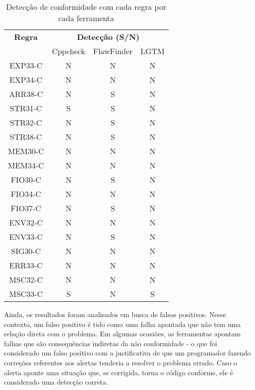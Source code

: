 \begin{table}[]
\begin{tabular}{@{}cccc@{}}
\toprule
\textbf{Regra} & \multicolumn{3}{c}{\textbf{Detecção (S/N)}} \\
               & Cppcheck & FlawFinder & LGTM \\ \midrule
EXP33-C        & N        & N          & N    \\ \midrule
EXP34-C        & N        & N          & N    \\ \midrule
ARR38-C        & N        & S          & N    \\ \midrule
STR31-C        & S        & S          & N    \\ \midrule
STR32-C        & N        & S          & N    \\ \midrule
STR38-C        & N        & S          & N    \\ \midrule
MEM30-C        & N        & N          & N    \\ \midrule
MEM34-C        & N        & N          & N    \\ \midrule
FIO30-C        & N        & S          & N    \\ \midrule
FIO34-C        & N        & N          & N    \\ \midrule
FIO37-C        & N        & S          & N    \\ \midrule
ENV32-C        & N        & N          & N    \\ \midrule
ENV33-C        & N        & S          & N    \\ \midrule
SIG30-C        & N        & N          & N    \\ \midrule
ERR33-C        & N        & N          & N    \\ \midrule
MSC32-C        & N        & N          & N    \\ \midrule
MSC33-C        & S        & N          & S    \\ \bottomrule
\end{tabular}
\caption{Detecção de conformidade com cada regra por cada ferramenta}
\label{tab:all}
\end{table}

Ainda, os resultados foram analisados em busca de falsos positivos. Nesse contexto, um falso positivo é tido como uma falha apontada que não tem uma relação direta com o problema. Em algumas ocasiões, as ferramentas apontam falhas que são consequências indiretas da não conformidade - o que foi considerado um falso positivo com a justificativa de que um programador fazendo correções referentes aos alertas tenderia a resolver o problema errado. Caso o alerta aponte uma situação que, se corrigida, torna o código conforme, ele é considerado uma detecção correta.

